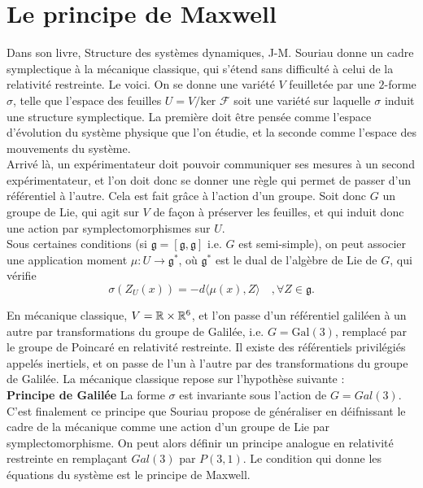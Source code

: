 \section{Le principe de Maxwell}

Dans son livre, Structure des systèmes dynamiques, J-M. Souriau donne un cadre symplectique à la mécanique classique, qui s'étend sans difficulté à celui de la relativité restreinte. Le voici. On se donne une variété $V$ feuilletée par une $2$-forme $\sigma$, telle que l'espace des feuilles $U=V/\text{ker }\mathcal F$ soit une variété sur laquelle $\sigma$ induit une structure symplectique. La première doit être pensée comme l'espace d'évolution du système physique que l'on étudie, et la seconde comme l'espace des mouvements du système.\\

Arrivé là, un expérimentateur doit pouvoir communiquer ses mesures à un second expérimentateur, et l'on doit donc se donner une règle qui permet de passer d'un référentiel à l'autre. Cela est fait grâce à l'action d'un groupe. Soit donc $G$ un groupe de Lie, qui agit sur $V$ de façon à préserver les feuilles, et qui induit donc une action par symplectomorphismes sur $U$.\\

Sous certaines conditions (si $\mathfrak g=[\mathfrak g,\mathfrak g]$ i.e. $G$ est semi-simple), on peut associer une application moment $\mu : U\rightarrow \mathfrak g^*$, où $\mathfrak g^*$ est le dual de l'algèbre de Lie de $G$, qui vérifie
\[\sigma(Z_U(x))=-d\langle \mu(x),Z\rangle\quad, \forall Z\in \mathfrak g.\]

En mécanique classique, $V = \mathbb R\times \mathbb R^6$, et l'on passe d'un référentiel galiléen à un autre par transformations du groupe de Galilée, i.e. $G=\text{Gal}(3)$, remplacé par le groupe de Poincaré en relativité restreinte. Il existe des référentiels privilégiés appelés inertiels, et on passe de l'un à l'autre par des transformations du groupe de Galilée. La mécanique classique repose sur l'hypothèse suivante :\\

\textbf{Principe de Galilée} La forme $\sigma$ est invariante sous l'action de $G=Gal(3)$.\\

C'est finalement ce principe que Souriau propose de généraliser en déifnissant le cadre de la mécanique comme une action d'un groupe de Lie par symplectomorphisme. On peut alors définir un principe analogue en relativité restreinte en remplaçant $Gal(3)$ par $P(3,1)$. Le condition qui donne les équations du système est le principe de Maxwell.\\

